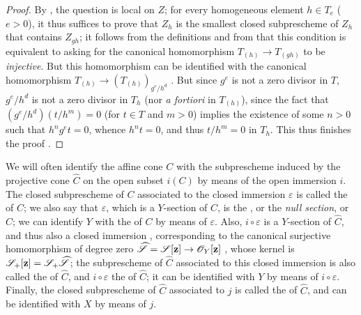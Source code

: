 \begin{proof}
By , the question is local on $Z$;
for every homogeneous element $h\in T_e$ ($e>0$), it thus suffices to prove that $Z_h$ is the smallest closed subprescheme of $Z_h$ that contains $Z_{gh}$;
it follows from the definitions and from  that this condition is equivalent to asking for the canonical homomorphism $T_{(h)}\to T_{(gh)}$ to be \emph{injective}.
But this homomorphism can be identified with the canonical homomorphism $T_{(h)}\to(T_{(h)})_{g^e/h^d}$ .
But since $g^e$ is not a zero divisor in $T$, $g^e/h^d$ is not a zero divisor in $T_h$ (nor \emph{a fortiori} in $T_{(h)}$), since the fact that $(g^e/h^d)(t/h^m)=0$ (for $t\in T$ and $m>0$) implies the existence of some $n>0$ such that $h^ng^et=0$, whence $h^nt=0$, and thus $t/h^m=0$ in $T_h$.
This thus finishes the proof .
\end{proof}

\begin{env}[8.3.3]
\label{2.8.3.3}
We will often identify the affine cone $C$ with the subprescheme induced by the projective cone $\widehat{C}$ on the open subset $i(C)$ by means of the open immersion $i$.
The closed subprescheme of $C$ associated to the closed immersion $\varepsilon$ is called the  of $C$;
we also say that $\varepsilon$, which is a $Y$-section of $C$, is the , or the \emph{null section},  or $C$;
we can identify $Y$ with the  of $C$ by means of $\varepsilon$.
Also, $i\circ\varepsilon$ is a $Y$-section of $\widehat{C}$, and thus also a closed immersion , corresponding to the canonical surjective homomorphism of degree zero $\widehat{\sh{S}} = \sh{S}[\bb{z}] \to \sh{O}_Y[\bb{z}]$ , whose kernel is $\mathscr{S}_+[\mathbf{z}] = \mathscr{S}_+\widehat{\mathscr{S}}$;
the subprescheme of $\widehat{C}$ associated to this closed immersion is also called the  of $\widehat{C}$, and $i\circ\varepsilon$ the  of $\widehat{C}$;
it can be identified with $Y$ by means of $i\circ\varepsilon$.
Finally, the closed subprescheme of $\widehat{C}$ associated to $j$ is called the  of $\widehat{C}$, and can be identified with $X$ by means of $j$.
\end{env}

